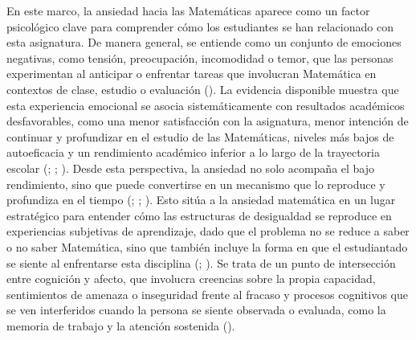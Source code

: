 \documentclass[
  spanish,
  a4paper,
  oneside]{scrbook}
\begin{document}
En este marco, la ansiedad hacia las Matemáticas aparece como un factor
psicológico clave para comprender cómo los estudiantes se han
relacionado con esta asignatura. De manera general, se entiende como un
conjunto de emociones negativas, como tensión, preocupación, incomodidad
o temor, que las personas experimentan al anticipar o enfrentar tareas
que involucran Matemática en contextos de clase, estudio o evaluación
(). La evidencia
disponible muestra que esta experiencia emocional se asocia
sistemáticamente con resultados académicos desfavorables, como una menor
satisfacción con la asignatura, menor intención de continuar y
profundizar en el estudio de las Matemáticas, niveles más bajos de
autoeficacia y un rendimiento académico inferior a lo largo de la
trayectoria escolar (;
;
). Desde esta perspectiva, la
ansiedad no solo acompaña el bajo rendimiento, sino que puede
convertirse en un mecanismo que lo reproduce y profundiza en el tiempo
(;
;
). Esto sitúa a la ansiedad
matemática en un lugar estratégico para entender cómo las estructuras de
desigualdad se reproduce en experiencias subjetivas de aprendizaje, dado
que el problema no se reduce a saber o no saber Matemática, sino que
también incluye la forma en que el estudiantado se siente al enfrentarse
esta disciplina (;
). Se trata de un punto de
intersección entre cognición y afecto, que involucra creencias sobre la
propia capacidad, sentimientos de amenaza o inseguridad frente al
fracaso y procesos cognitivos que se ven interferidos cuando la persona
se siente observada o evaluada, como la memoria de trabajo y la atención
sostenida ().
\end{document}

